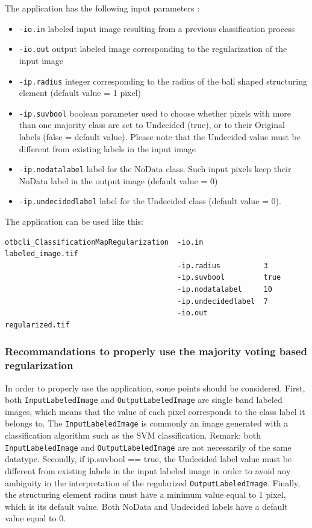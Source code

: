 The  application has the following input parameters :
\begin{itemize}
\item \verb?-io.in? labeled input image resulting from a previous classification process
\item \verb?-io.out? output labeled image corresponding to the regularization of the input image
\item \verb?-ip.radius? integer corresponding to the radius of the ball shaped structuring element (default value = 1 pixel)
\item \verb?-ip.suvbool? boolean parameter used to choose whether pixels with more than one majority class are set to Undecided (true),
or to their Original labels (false = default value). Please note that the Undecided value must be different from existing labels in the input image
\item \verb?-ip.nodatalabel? label for the NoData class. Such input pixels keep their NoData label in the output image (default value = 0)
\item \verb?-ip.undecidedlabel? label for the Undecided class (default value = 0).
\end{itemize}


The application can be used like this:
\begin{verbatim}
otbcli_ClassificationMapRegularization  -io.in              labeled_image.tif
                                        -ip.radius          3
                                        -ip.suvbool         true
                                        -ip.nodatalabel     10
                                        -ip.undecidedlabel  7
                                        -io.out             regularized.tif
\end{verbatim}
 

\subsubsection{Recommandations to properly use the majority voting based regularization}

In order to properly use the  application, some points should be considered.
First, both \verb?InputLabeledImage? and \verb?OutputLabeledImage? are single band labeled images, which means that the
value of each pixel corresponds to the class label it belongs to. The \verb?InputLabeledImage? is commonly an image generated
with a classification algorithm such as the SVM classification. Remark: both
\verb?InputLabeledImage? and \verb?OutputLabeledImage? are not necessarily of the same datatype. Secondly, if ip.suvbool == true,
the Undecided label value must be different from existing labels in the input labeled image in order to avoid any ambiguity in the
interpretation of the regularized \verb?OutputLabeledImage?. Finally, the structuring element radius must have a minimum value equal to 1 pixel,
which is its default value. Both NoData and Undecided labels have a default value equal to 0.


